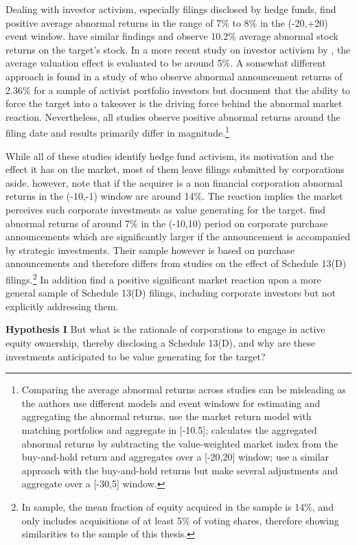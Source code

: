 \documentclass[12pt]{article}
\begin{document}
Dealing with investor activism, especially filings disclosed by hedge funds, \citet[p.1730]{Brav2008} find positive average abnormal returns in the range of 7\% to 8\% in the (-20,+20) event window. \citet[p.188]{Klein2009} have similar findings and observe 10.2\% average abnormal stock returns on the target's stock. In a more recent study on investor activism by \citet[p.410]{Denes2017}, the average valuation effect is evaluated to be around 5\%. A somewhat different approach is found in a study of \citet[p.363]{Greenwood2009} who observe abnormal announcement returns of 2.36\% for a sample of activist portfolio investors but document that the ability to force the target into a takeover is the driving force behind the abnormal market reaction. Nevertheless, all studies observe positive abnormal returns around the filing date and results primarily differ in magnitude.\footnote{Comparing the average abnormal returns across studies can be misleading as the authors use different models and event windows for estimating and aggregating the abnormal returns. \citet{Greenwood2009} use the market return model with matching portfolios and aggregate in [-10.5]; \citet{Brav2008} calculates the aggregated abnormal returns by subtracting the value-weighted market index from the buy-and-hold return and aggregates over a [-20,20] window; \citet{Klein2009} use a similar approach with the buy-and-hold returns but make several adjustments and aggregate over a [-30,5] window.}

While all of these studies identify hedge fund activism, its motivation and the effect it has on the market, most of them leave filings submitted by corporations aside. \citet[p.29]{Brigida2012} however, note that if the acquirer is a non financial corporation abnormal returns in the (-10,-1) window are around 14\%. The reaction implies the market perceives such corporate investments as value generating for the target. \citet[p.2803]{Allen2000} find abnormal returns of around 7\% in the (-10,10) period on corporate purchase announcements which are significantly larger if the announcement is accompanied by strategic investments. Their sample however is based on purchase announcements and therefore differs from studies on the effect of Schedule 13(D) filings.\footnote{In \citet[p.2801]{Allen2000} sample, the mean fraction of equity acquired in the sample is 14\%, and  only includes acquisitions of at least 5\% of voting shares, therefore showing similarities to the sample of this thesis.} In addition \citet{Collin-Dufresne2015} find a positive significant market reaction upon a more general sample of Schedule 13(D) filings, including corporate investors but not explicitly addressing them.\par
\textbf{Hypothesis I}
But what is the rationale of corporations to engage in active equity ownership, thereby disclosing a Schedule 13(D), and why are these investments anticipated to be value generating for the target?
\end{document}
